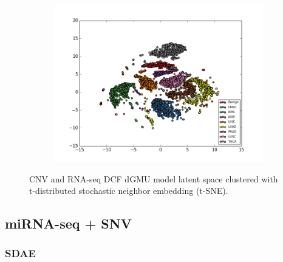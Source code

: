 \begin{figure}[H]
     \centering
     \begin{subfigure}[b]{\textwidth}
         \centering
         \includegraphics[width=\textwidth]{img/c_r/c_r_dcf_tsne.png}
     \end{subfigure}
        \caption{CNV and RNA-seq DCF dGMU model latent space clustered with t-distributed stochastic neighbor embedding (t-SNE).}
        \label{fig:c_r_dcf_tsne}
\end{figure}


\subsection{miRNA-seq + SNV}\label{sub:m_s_results}

\subsubsection{SDAE}

